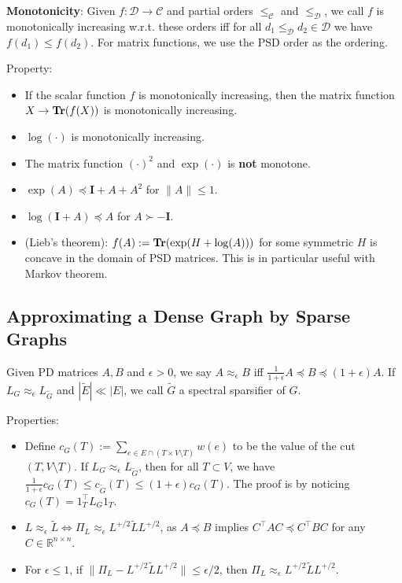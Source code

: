 \textbf{Monotonicity}: Given $f: \mathcal{D} \rightarrow \mathcal{C}$ and partial orders $\le_{\mathcal{C}}$ and $\le_{\mathcal{D}}$, we call $f$ is monotonically increasing w.r.t. these orders iff for all $d_1 \le_{\mathcal{D}} d_2 \in \mathcal{D}$ we have $f(d_1) \le f(d_2)$. For matrix functions, we use the PSD order as the ordering.

Property:
\begin{itemize}
    \item If the scalar function $f$ is monotonically increasing, then the matrix function $X \rightarrow \operatorname{\textbf{Tr}}(f(X))$ is monotonically increasing.
    \item $\log(\cdot)$ is monotonically increasing.
    \item The matrix function $(\cdot)^2$ and $\exp(\cdot)$ is \textbf{not} monotone.
    \item $\exp(A) \preceq \boldsymbol{I} + A + A^2$ for $\|A\| \le 1$.
    \item $\log(\boldsymbol{I}+A) \preceq A$ for $A \succ -\boldsymbol{I}$.
    \item (Lieb's theorem): $f(A):= \operatorname{\textbf{Tr}}(\exp(H+\log(A)))$ for some symmetric $H$ is concave in the domain of PSD matrices. This is in particular useful with Markov theorem.
\end{itemize}

\subsection{Approximating a Dense Graph by Sparse Graphs}

Given PD matrices $A, B$ and $\epsilon>0$, we say $A \approx_{\epsilon} B$ iff $\frac{1}{1+\epsilon} A \preceq B \preceq (1+\epsilon) A$. If $L_G \approx_{\epsilon} L_{\tilde{G}}$ and $|\tilde{E}| \ll |E|$, we call $\tilde{G}$ a spectral sparsifier of $G$.

Properties:
\begin{itemize}
    \item Define $c_G(T) := \sum_{e \in E \cap (T\times V\setminus T)} w(e)$ to be the value of the cut $(T, V\setminus T)$. If $L_G \approx_{\epsilon} L_{\tilde{G}}$, then for all $T \subset V$, we have $\frac{1}{1+\epsilon} c_G(T) \le c_{\tilde{G}}(T) \le (1+\epsilon) c_G(T)$. The proof is by noticing $c_G(T) = 1_T^\top L_G 1_T$.
    \item $L \approx_{\epsilon} \tilde{L} \Leftrightarrow \Pi_L \approx_\epsilon L^{+/2} \tilde{L} L^{+/2}$, as $A \preceq B$ implies $C^\top A C \preceq C^\top B C$ for any $C\in \mathbb{R}^{n\times n}$.
    \item For $\epsilon \le 1$, if $\|\Pi_L - L^{+/2} \tilde{L} L^{+/2}\| \le \epsilon/2$, then $\Pi_L \approx_\epsilon L^{+/2} \tilde{L} L^{+/2}$.
\end{itemize}

